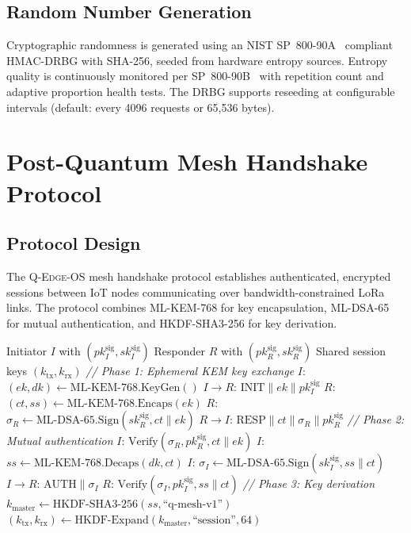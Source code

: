 \documentclass[conference,10pt]{IEEEtran}
\newcommand{\mlkem}{\textrm{ML-KEM}}
\newcommand{\mldsa}{\textrm{ML-DSA}}
\newcommand{\system}{\textsc{Q-Edge-OS}}
\begin{document}
\subsection{Random Number Generation}

Cryptographic randomness is generated using an NIST SP~800-90A~\cite{sp80090a} compliant HMAC-DRBG with SHA-256, seeded from hardware entropy sources. Entropy quality is continuously monitored per SP~800-90B~\cite{sp80090b} with repetition count and adaptive proportion health tests. The DRBG supports reseeding at configurable intervals (default: every 4096 requests or 65,536 bytes).

\section{Post-Quantum Mesh Handshake Protocol}
\label{sec:mesh}

\subsection{Protocol Design}

The \system{} mesh handshake protocol establishes authenticated, encrypted sessions between IoT nodes communicating over bandwidth-constrained LoRa links. The protocol combines ML-KEM-768 for key encapsulation, ML-DSA-65 for mutual authentication, and HKDF-SHA3-256 for key derivation.

\begin{algorithm}[t]
\caption{PQ Mesh Handshake Protocol}
\label{alg:handshake}
\begin{algorithmic}[1]
\REQUIRE Initiator $I$ with $(pk_I^{\text{sig}}, sk_I^{\text{sig}})$
\REQUIRE Responder $R$ with $(pk_R^{\text{sig}}, sk_R^{\text{sig}})$
\ENSURE Shared session keys $(k_{\text{tx}}, k_{\text{rx}})$
\STATE \textit{// Phase 1: Ephemeral KEM key exchange}
\STATE $I$: $(ek, dk) \gets \mlkem\text{-768.KeyGen}()$
\STATE $I \to R$: $\text{INIT} \| ek \| pk_I^{\text{sig}}$ 
\STATE $R$: $(ct, ss) \gets \mlkem\text{-768.Encaps}(ek)$
\STATE $R$: $\sigma_R \gets \mldsa\text{-65.Sign}(sk_R^{\text{sig}}, ct \| ek)$
\STATE $R \to I$: $\text{RESP} \| ct \| \sigma_R \| pk_R^{\text{sig}}$
\STATE \textit{// Phase 2: Mutual authentication}
\STATE $I$: $\text{Verify}(\sigma_R, pk_R^{\text{sig}}, ct \| ek)$
\STATE $I$: $ss \gets \mlkem\text{-768.Decaps}(dk, ct)$
\STATE $I$: $\sigma_I \gets \mldsa\text{-65.Sign}(sk_I^{\text{sig}}, ss \| ct)$
\STATE $I \to R$: $\text{AUTH} \| \sigma_I$
\STATE $R$: $\text{Verify}(\sigma_I, pk_I^{\text{sig}}, ss \| ct)$
\STATE \textit{// Phase 3: Key derivation}
\STATE $k_{\text{master}} \gets \text{HKDF-SHA3-256}(ss, \text{``q-mesh-v1''})$
\STATE $(k_{\text{tx}}, k_{\text{rx}}) \gets \text{HKDF-Expand}(k_{\text{master}}, \text{``session''}, 64)$
\end{algorithmic}
\end{algorithm}
\end{document}
